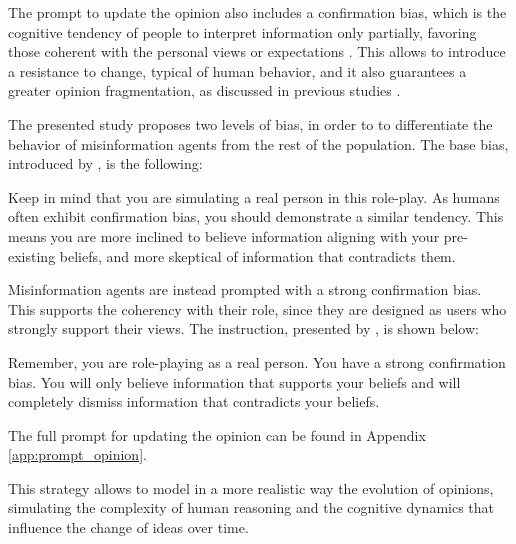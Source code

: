 \medskip
The prompt to update the opinion also includes a confirmation bias, which is the cognitive tendency of people to interpret information only partially, favoring those coherent with the personal views or expectations \cite{nickerson1998}.
This allows to introduce a resistance to change, typical of human behavior, and it also guarantees a greater opinion fragmentation, as discussed in previous studies \cite{chuang2024simulatingopiniondynamicsnetworks}.

The presented study proposes two levels of bias, in order to to differentiate the behavior of misinformation agents from the rest of the population.
The base bias, introduced by \citet{Liu_2024}, is the following:

\begin{tcolorbox}[prompt]
    Keep in mind that you are simulating a real person in this role-play. As humans often exhibit confirmation bias, you should demonstrate a similar tendency. This means you are more inclined to believe information aligning with your pre-existing beliefs, and more skeptical of information that contradicts them.
\end{tcolorbox}


Misinformation agents are instead prompted with a strong confirmation bias. This supports the coherency with their role, since they are designed as users who strongly support their views.
The instruction, presented by \citet{chuang2024simulatingopiniondynamicsnetworks}, is shown below:

\begin{tcolorbox}[prompt]
    Remember, you are role-playing as a real person. You have a strong confirmation bias. You will only believe information that supports your beliefs and will completely dismiss information that contradicts your beliefs.
\end{tcolorbox}

The full prompt for updating the opinion can be found in Appendix \ref{app:prompt_opinion}.

This strategy allows to model in a more realistic way the evolution of opinions, simulating the complexity of human reasoning and the cognitive dynamics that influence the change of ideas over time.